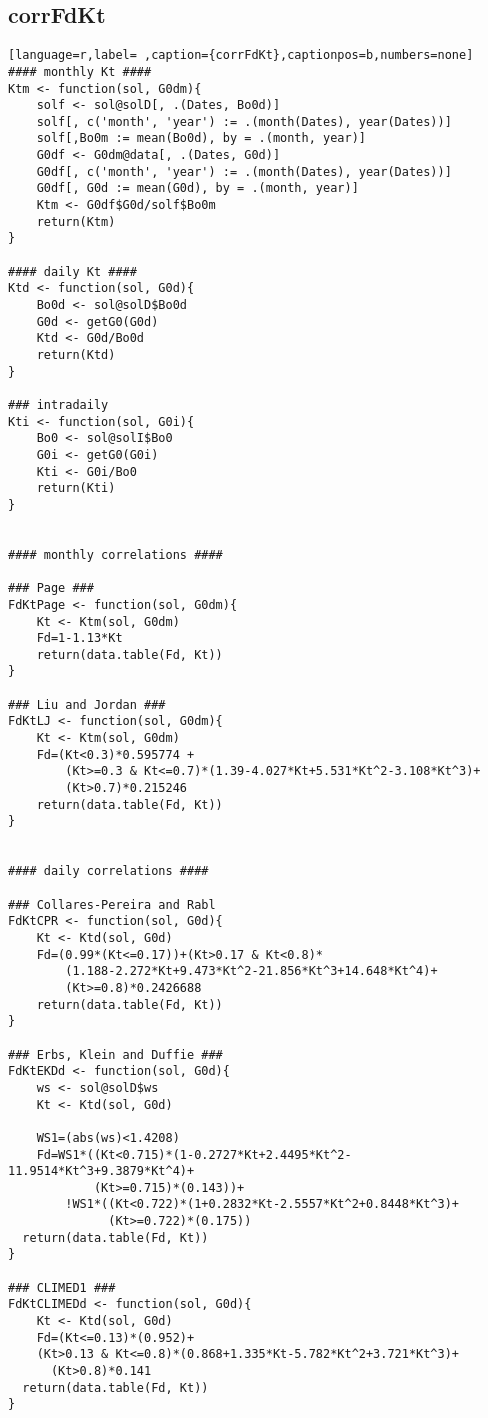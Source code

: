 \subsection{corrFdKt}
\label{sec:orge0c1bdd}
\label{subsec:corrfdkt}
\begin{lstlisting}[language=r,label= ,caption={corrFdKt},captionpos=b,numbers=none]
#### monthly Kt ####
Ktm <- function(sol, G0dm){
    solf <- sol@solD[, .(Dates, Bo0d)]
    solf[, c('month', 'year') := .(month(Dates), year(Dates))]
    solf[,Bo0m := mean(Bo0d), by = .(month, year)]
    G0df <- G0dm@data[, .(Dates, G0d)]
    G0df[, c('month', 'year') := .(month(Dates), year(Dates))]
    G0df[, G0d := mean(G0d), by = .(month, year)]
    Ktm <- G0df$G0d/solf$Bo0m
    return(Ktm)
}

#### daily Kt ####
Ktd <- function(sol, G0d){
    Bo0d <- sol@solD$Bo0d
    G0d <- getG0(G0d)
    Ktd <- G0d/Bo0d
    return(Ktd)
}

### intradaily
Kti <- function(sol, G0i){
    Bo0 <- sol@solI$Bo0
    G0i <- getG0(G0i)
    Kti <- G0i/Bo0
    return(Kti)
}


#### monthly correlations ####

### Page ###
FdKtPage <- function(sol, G0dm){
    Kt <- Ktm(sol, G0dm)
    Fd=1-1.13*Kt
    return(data.table(Fd, Kt))
}

### Liu and Jordan ###
FdKtLJ <- function(sol, G0dm){
    Kt <- Ktm(sol, G0dm)
    Fd=(Kt<0.3)*0.595774 +
        (Kt>=0.3 & Kt<=0.7)*(1.39-4.027*Kt+5.531*Kt^2-3.108*Kt^3)+
        (Kt>0.7)*0.215246
    return(data.table(Fd, Kt))
}


#### daily correlations ####

### Collares-Pereira and Rabl
FdKtCPR <- function(sol, G0d){
    Kt <- Ktd(sol, G0d)
    Fd=(0.99*(Kt<=0.17))+(Kt>0.17 & Kt<0.8)*
        (1.188-2.272*Kt+9.473*Kt^2-21.856*Kt^3+14.648*Kt^4)+
        (Kt>=0.8)*0.2426688      
    return(data.table(Fd, Kt))
}

### Erbs, Klein and Duffie ###
FdKtEKDd <- function(sol, G0d){
    ws <- sol@solD$ws
    Kt <- Ktd(sol, G0d)

    WS1=(abs(ws)<1.4208)
    Fd=WS1*((Kt<0.715)*(1-0.2727*Kt+2.4495*Kt^2-11.9514*Kt^3+9.3879*Kt^4)+
            (Kt>=0.715)*(0.143))+
        !WS1*((Kt<0.722)*(1+0.2832*Kt-2.5557*Kt^2+0.8448*Kt^3)+
              (Kt>=0.722)*(0.175))
  return(data.table(Fd, Kt))
}

### CLIMED1 ###
FdKtCLIMEDd <- function(sol, G0d){
    Kt <- Ktd(sol, G0d)
    Fd=(Kt<=0.13)*(0.952)+
    (Kt>0.13 & Kt<=0.8)*(0.868+1.335*Kt-5.782*Kt^2+3.721*Kt^3)+
      (Kt>0.8)*0.141
  return(data.table(Fd, Kt))
}


\end{lstlisting}
